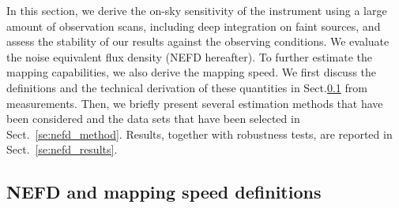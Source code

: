 
%

In this section, we derive the on-sky sensitivity of the instrument using a
large amount of observation scans, including deep integration on faint sources,
and assess the stability of our results against the observing conditions. We
evaluate the noise equivalent flux density (NEFD hereafter). To further estimate
the mapping capabilities, we also derive the mapping speed. We first discuss the
definitions and the technical derivation of these quantities in
Sect.\ref{se:integration_time} from measurements. Then, we briefly present
several estimation methods that have been considered and the data sets that have
been selected in Sect.~\ref{se:nefd_method}.  Results, together with robustness
tests, are reported in Sect.~\ref{se:nefd_results}.


\subsection{NEFD and mapping speed definitions}
\label{se:integration_time}

